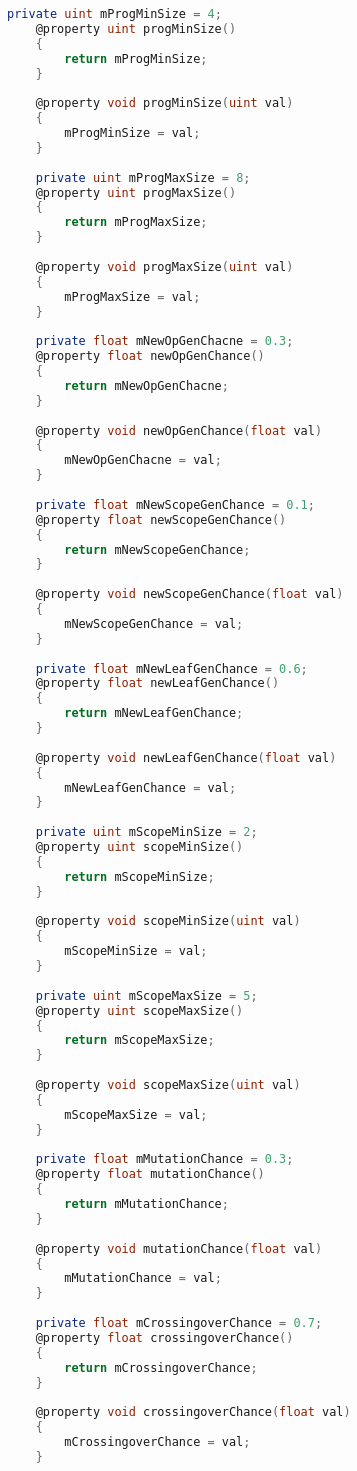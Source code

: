 \documentclass[russian,utf8,emptystyle]{eskdtext}
\begin{document}
\begin{lstlisting}[language=D]
    private uint mProgMinSize = 4;
    @property uint progMinSize()
    {
        return mProgMinSize;
    }
    
    @property void progMinSize(uint val)
    {
        mProgMinSize = val;
    }
    
    private uint mProgMaxSize = 8;
    @property uint progMaxSize()
    {
        return mProgMaxSize;
    }
    
    @property void progMaxSize(uint val)
    {
        mProgMaxSize = val;
    }
    
    private float mNewOpGenChacne = 0.3;
    @property float newOpGenChance()
    {
        return mNewOpGenChacne;
    }
    
    @property void newOpGenChance(float val)
    {
        mNewOpGenChacne = val;
    }
    
    private float mNewScopeGenChance = 0.1;
    @property float newScopeGenChance()
    {
        return mNewScopeGenChance;
    }
    
    @property void newScopeGenChance(float val)
    {
        mNewScopeGenChance = val;
    }
      
    private float mNewLeafGenChance = 0.6;
    @property float newLeafGenChance()
    {
        return mNewLeafGenChance;
    }
    
    @property void newLeafGenChance(float val)
    {
        mNewLeafGenChance = val;
    }
    
    private uint mScopeMinSize = 2;
    @property uint scopeMinSize()
    {
        return mScopeMinSize;
    }
    
    @property void scopeMinSize(uint val)
    {
        mScopeMinSize = val;
    }
    
    private uint mScopeMaxSize = 5;
    @property uint scopeMaxSize()
    {
        return mScopeMaxSize;
    }
    
    @property void scopeMaxSize(uint val)
    {
        mScopeMaxSize = val;
    }
    
    private float mMutationChance = 0.3;
    @property float mutationChance()
    {
        return mMutationChance;
    }
    
    @property void mutationChance(float val)
    {
        mMutationChance = val;
    }
    
    private float mCrossingoverChance = 0.7;
    @property float crossingoverChance()
    {
        return mCrossingoverChance;
    }
    
    @property void crossingoverChance(float val)
    {
        mCrossingoverChance = val;
    }
    

\end{lstlisting}
\end{document}
